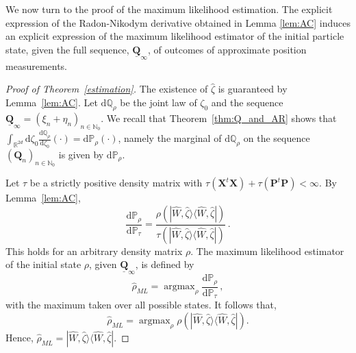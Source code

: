 \documentclass[11pt]{article}
\newcommand{\ket}[1]{|{#1}\rangle}
\newcommand{\bra}[1]{\langle{#1}|}
\renewcommand{\d}{{\mathrm d}}
\begin{document}
We now turn to the proof of the maximum likelihood estimation. The explicit expression of the Radon-Nikodym derivative obtained in Lemma \ref{lem:AC} induces an explicit expression of the maximum likelihood estimator of the initial particle state, given the full sequence, $\underline{\mathbf Q}_\infty$, of outcomes of approximate position measurements.
\begin{proof}[Proof of Theorem~\ref{estimation}]
	The existence of $\widehat \zeta$ is guaranteed by Lemma~\ref{lem:AC}. Let $\d\mathbb Q_\rho$ be the joint law of $\zeta_0$ and the sequence $\underline{\mathbf Q}_\infty=(\xi_n+ \eta_n)_{n\in\mathbb N_0}$.
	We recall that Theorem~\ref{thm:Q_and_AR} shows that $\int_{\mathbb R^{2d}}\d\zeta_0 \frac{\d\mathbb Q_\rho}{\d\zeta_0}(\cdot) =\d\mathbb P_\rho(\cdot)$, namely the marginal of $\d\mathbb Q_\rho$ on the sequence 
	$(\mathbf Q_n)_{n\in\mathbb N_0}$ is given by $\d\mathbb P_\rho$.
	
	Let $\tau$ be a strictly positive density matrix with 
	\mbox{$\tau(\mathbf X^t\mathbf X)+\tau(\mathbf P^t\mathbf P)<\infty$.}
	By Lemma~\ref{lem:AC},
	$$\frac{\d\mathbb P_\rho}{\d\mathbb P_\tau}=\frac{\rho(\ket{\widehat W,\widehat \zeta}\bra{\widehat W,\widehat \zeta})} {\tau(\ket{\widehat W,\widehat \zeta}\bra{\widehat W,\widehat \zeta})}\,.$$
	This holds for an arbitrary density matrix $\rho$. The maximum likelihood estimator of the initial state $\rho$, 
	given $\underline{\mathbf Q}_\infty$, is defined by
	$$\widehat \rho_{ML}=\operatorname{argmax}_{\rho} \frac{\d\mathbb P_\rho}{\d\mathbb P_\tau}\,,$$
	with the maximum taken over all possible states. It follows that,
	$$\widehat \rho_{ML}= \operatorname{argmax}_{\rho} \rho(\ket{\widehat W,\widehat \zeta}\bra{\widehat W,\widehat \zeta}).$$
	Hence, $\widehat \rho_{ML}=\ket{\widehat W,\widehat \zeta}\bra{\widehat W,\widehat \zeta}$. 
\end{proof}
\end{document}
